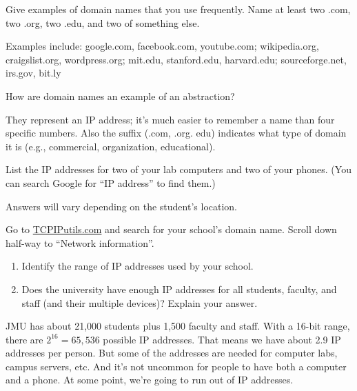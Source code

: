 \Q Give examples of domain names that you use frequently.
Name at least two .com, two .org, two .edu, and two of something else.

\begin{answer}[5em]
Examples include:
google.com, facebook.com, youtube.com;
wikipedia.org, craigslist.org, wordpress.org;
mit.edu, stanford.edu, harvard.edu;
sourceforge.net, irs.gov, bit.ly
\end{answer}


\Q How are domain names an example of an abstraction?

\begin{answer}[5em]
They represent an IP address; it's much easier to remember a name than four specific numbers.
Also the suffix (.com, .org. edu) indicates what type of domain it is (e.g., commercial, organization, educational).
\end{answer}


\Q List the IP addresses for two of your lab computers and two of your phones.
(You can search Google for ``IP address'' to find them.)

\begin{answer}[5em]
Answers will vary depending on the student's location.
\end{answer}


\Q Go to \href{http://www.tcpiputils.com/}{TCPIPutils.com} and search for your school's domain name.
Scroll down half-way to ``Network information''.
\begin{enumerate}
\item Identify the range of IP addresses used by your school. 
\item Does the university have enough IP addresses for all students, faculty, and staff (and their multiple devices)? Explain your answer.
\end{enumerate}

\vspace{-1em}

\begin{answer}[6em]
JMU has about 21,000 students plus 1,500 faculty and staff.
With a 16-bit range, there are $2^{16} = 65,536$ possible IP addresses.
That means we have about 2.9 IP addresses per person.
But some of the addresses are needed for computer labs, campus servers, etc.
And it's not uncommon for people to have both a computer and a phone.
At some point, we're going to run out of IP addresses.
\end{answer}
